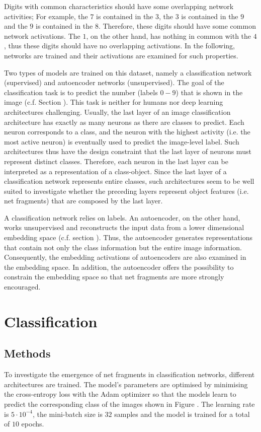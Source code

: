 Digits with common characteristics should have some overlapping network activities;
For example, the $7$ is contained in the $3$, the $3$ is contained in the $9$ and the $9$ is contained in the $8$.
Therefore, these digits should have some common network activations.
The $1$, on the other hand, has nothing in common with the $4$, thus these digits should have no overlapping activations.
In the following, networks are trained and their activations are examined for such properties.

Two types of models are trained on this dataset, namely a classification network (supervised) and autoencoder networks (unsupervised).
The goal of the classification task is to predict the number (labels $0-9$) that is shown in the image (c.f. Section ).
This task is neither for humans nor deep learning architectures challenging.
Usually, the last layer of an image classification architecture has exactly as many neurons as there are classes to predict.
Each neuron corresponds to a class, and the neuron with the highest activity (i.e. the most active neuron) is eventually used to predict the image-level label.
Such architectures thus have the design constraint that the last layer of neurons must represent distinct classes.
Therefore, each neuron in the last layer can be interpreted as a representation of a class-object.
Since the last layer of a classification network represents entire classes, such architectures seem to be well suited to investigate whether the preceding layers represent object features (i.e. net fragments) that are composed by the last layer.

A classification network relies on labels.
An autoencoder, on the other hand, works unsupervised and reconstructs the input data from a lower dimensional embedding space (c.f. section ).
Thus, the autoencoder generates representations that contain not only the class information but the entire image information.
Consequently, the embedding activations of autoencoders are also examined in the embedding space.
In addition, the autoencoder offers the possibility to constrain the embedding space so that net fragments are more strongly encouraged.



\section{Classification}

\subsection{Methods}
To investigate the emergence of net fragments in classification networks, different architectures are trained.
The model's parameters are optimised by minimising the cross-entropy loss with the Adam optimizer  so that the models learn to predict the corresponding class of the images shown in Figure .
The learning rate is $5 \cdot 10^{-4}$, the mini-batch size is $32$ samples and the model is trained for a total of $10$ epochs.

